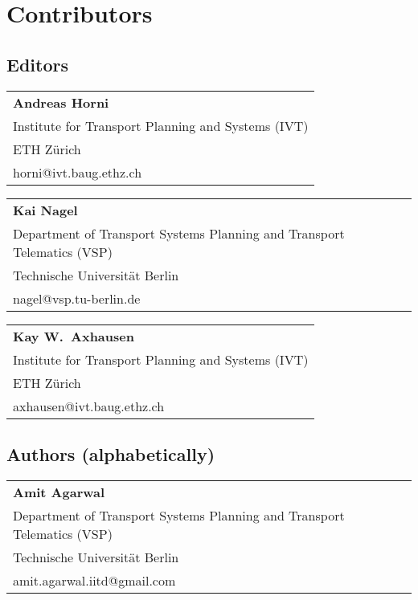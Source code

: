 \chapter*{Contributors}
\section*{Editors}

\noindent\begin{tabular}[width=0.48\textwidth]{@{}l}
\textbf{Andreas Horni} \\
Institute for Transport Planning and Systems (IVT) \\
ETH Zürich \\
horni@ivt.baug.ethz.ch \\
\end{tabular}

\begin{tabular}[width=0.48\textwidth]{@{}l}
\textbf{Kai Nagel} \\
Department of Transport Systems Planning and Transport Telematics (VSP) \\
Technische Universität Berlin \\
nagel@vsp.tu-berlin.de \\
\end{tabular}

\begin{tabular}[width=0.48\textwidth]{@{}l}
\textbf{Kay W.\ Axhausen} \\
Institute for Transport Planning and Systems (IVT) \\
ETH Zürich \\
axhausen@ivt.baug.ethz.ch \\
\end{tabular}

\section*{Authors (alphabetically)}

\begin{tabular}[width=0.48\textwidth]{@{}l}
\textbf{Amit Agarwal} \\
Department of Transport Systems Planning and Transport Telematics (VSP) \\
Technische Universität Berlin \\
amit.agarwal.iitd@gmail.com \\
\end{tabular}


